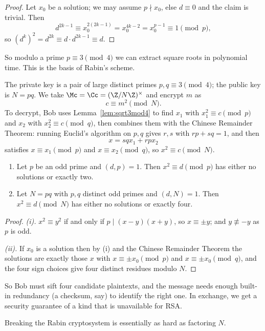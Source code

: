 \begin{proof}
	Let $x_0$ be a solution; we may assume $p \nmid x_0$, else $d \equiv 0$ and the claim is trivial. Then
	$$d^{2k-1}\equiv x_0^{2(2k-1)} = x_0^{4k-2}=x_0^{p-1}\equiv1\pmod p,$$
	so $(d^k)^2 = d^{2k} \equiv d\cdot d^{2k-1}\equiv d$.
\end{proof}

So modulo a prime $p \equiv 3\pmod 4$ we can extract square roots in polynomial time. This is the basis of Rabin's scheme.

The private key is a pair of large distinct primes $p,q \equiv 3\pmod 4$; the public key is $N = pq$. We take $\Mc = \Cc = (\Z/N\Z)^\times$ and encrypt $m$ as
$$c \equiv m^2 \pmod N.$$
To decrypt, Bob uses Lemma~\ref{lem:sqrt3mod4} to find $x_1$ with $x_1^2\equiv c \pmod p$ and $x_2$ with $x_2^2\equiv c\pmod q$, then combines them with the Chinese Remainder Theorem: running Euclid's algorithm on $p,q$ gives $r,s$ with $rp+sq=1$, and then
$$x = sqx_1+rpx_2$$
satisfies $x \equiv x_1 \pmod p$ and $x\equiv x_2\pmod q$, so $x^2\equiv c\pmod N$.

\begin{lemma}
	\begin{enumerate}[label=(\roman*)]
		\item Let $p$ be an odd prime and $(d,p)=1$. Then $x^2\equiv d\pmod p$ has either no solutions or exactly two.
		\item Let $N = pq$ with $p,q$ distinct odd primes and $(d,N)=1$. Then $x^2\equiv d\pmod N$ has either no solutions or exactly four.
	\end{enumerate}
\end{lemma}

\begin{proof}
	\emph{(i).} $x^2\equiv y^2$ if and only if $p \mid (x-y)(x+y)$, so $x\equiv\pm y$; and $y\not\equiv-y$ as $p$ is odd.

	\emph{(ii).} If $x_0$ is a solution then by (i) and the Chinese Remainder Theorem the solutions are exactly those $x$ with $x\equiv\pm x_0 \pmod p$ and $x \equiv \pm x_0\pmod q$, and the four sign choices give four distinct residues modulo $N$.
\end{proof}

So Bob must sift four candidate plaintexts, and the message needs enough built-in redundancy (a checksum, say) to identify the right one. In exchange, we get a security guarantee of a kind that is unavailable for RSA.

\begin{theorem}
	Breaking the Rabin cryptosystem is essentially as hard as factoring $N$.
\end{theorem}

